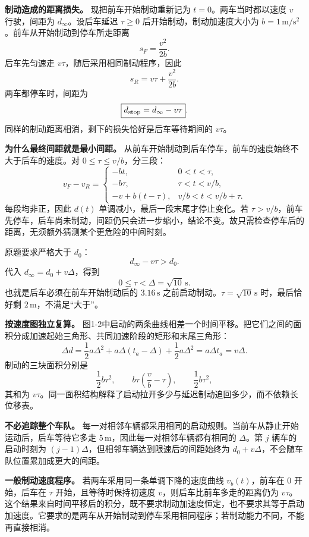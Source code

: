 \documentclass[12pt,a4paper,UTF8]{ctexart}
\begin{document}
\textbf{制动造成的距离损失。} 现把前车开始制动重新记为
\(t=0\)。两车当时都以速度 \(v\) 行驶，间距为 \(d_\infty\)。设后车延迟
\(\tau\ge0\) 后开始制动，制动加速度大小为
\(b=1\,\mathrm{m/s^2}\)。前车从开始制动到停车所走距离 \[
s_F=\frac{v^2}{2b}.
\] 后车先匀速走 \(v\tau\)，随后采用相同制动程序，因此 \[
s_R=v\tau+\frac{v^2}{2b}.
\] 两车都停车时，间距为 \[
\boxed{d_{\rm stop}=d_\infty-v\tau}.
\] 同样的制动距离相消，剩下的损失恰好是后车等待期间的 \(v\tau\)。

\textbf{为什么最终间距就是最小间距。}
从前车开始制动到后车停车，前车的速度始终不大于后车的速度。对
\(0\le\tau\le v/b\)，分三段： \[
v_F-v_R=
\begin{cases}
-bt,&0<t<\tau,\\
-b\tau,&\tau<t<v/b,\\
-v+b(t-\tau),&v/b<t<v/b+\tau.
\end{cases}
\] 每段均非正，因此 \(d(t)\) 单调减小，最后一段末尾才停止变化。若
\(\tau>v/b\)，前车先停车，后车尚未制动，间距仍只会进一步缩小，结论不变。故只需检查停车后的距离，无须额外猜测某个更危险的中间时刻。

原题要求严格大于 \(d_0\)： \[
d_\infty-v\tau>d_0.
\] 代入 \(d_\infty=d_0+v\Delta\)，得到 \[
\boxed{0\le\tau<\Delta=\sqrt{10}\,\mathrm s}.
\] 也就是后车必须在前车开始制动后的 \(3.16\,\mathrm s\)
之前启动制动。\(\tau=\sqrt{10}\,\mathrm s\) 时，最后恰好剩
\(2\,\mathrm m\)，不满足``大于''。

\textbf{按速度图独立复算。}
图1-2中启动的两条曲线相差一个时间平移。把它们之间的面积分成加速起始三角形、共同加速阶段的矩形和末尾三角形：
\[
\Delta d
=\frac12a\Delta^2
+a\Delta(t_a-\Delta)
+\frac12a\Delta^2
=a\Delta t_a=v\Delta.
\] 制动的三块面积分别是 \[
\frac12b\tau^2,\qquad
b\tau\left(\frac vb-\tau\right),\qquad
\frac12b\tau^2,
\] 其和为
\(v\tau\)。同一面积结构解释了启动拉开多少与延迟制动追回多少，而不依赖长位移表。

\textbf{不必追踪整个车队。}
每一对相邻车辆都采用相同的启动规则。当前车从静止开始运动后，后车等待它多走
\(5\,\mathrm m\)，因此每一对相邻车辆都有相同的 \(\Delta\)。第 \(j\)
辆车的启动时刻为 \((j-1)\Delta\)，但相邻车辆达到限速后的间距始终为
\(d_0+v\Delta\)，不会随车队位置累加成更大的间距。

\textbf{一般制动速度程序。} 若两车采用同一条单调下降的速度曲线
\(v_b(t)\)，前车在 \(0\) 开始，后车在 \(\tau\) 开始，且等待时保持初速度
\(v\)，则后车比前车多走的距离仍为
\(v\tau\)。这个结果来自时间平移后的积分，既不要求制动加速度恒定，也不要求其等于启动加速度。它要求的是两车从开始制动到停车采用相同程序；若制动能力不同，不能再直接相消。
\end{document}
